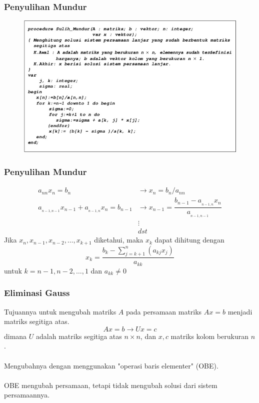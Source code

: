 \documentclass{beamer}
\begin{document}

\begin{frame}
\frametitle{Penyulihan Mundur}
\begin{figure}[htp]
\centering
\includegraphics[scale=0.45]{sulihmundur.jpg}
\end{figure}\end{frame}


\begin{frame}
\frametitle{Penyulihan Mundur}
\begin{equation}
\begin{split}
a_{nn}x_n = b_n &\rightarrow x_n = b_n/a_{nn}
\\a_{_{n-1,n-1}}x_{n-1}+a_{_{n-1,n}}x_n = b_{n-1} &\rightarrow x_{n-1} = \dfrac{b_{n-1}-a_{_{n-1,n}}x_n}{a_{_{n-1,n-1}}}
\\&\vdots
\\&dst
\end{split}
\nonumber
\end{equation}
Jika $x_n,x_{n-1},x_{n-2},\dots,x_{k+1}$ diketahui, maka $x_k$ dapat dihitung dengan 
\begin{equation}
x_k = \dfrac{b_k - \sum_{j=k+1}^n{(a_{kj}x_j)}}{a_{kk}}
\nonumber
\end{equation}
untuk $k=n-1,n-2,\dots, 1$ dan $a_{kk} \neq 0$
\end{frame}


\begin{frame}
\frametitle{Eliminasi Gauss}
Tujuannya untuk mengubah matriks $A$ pada persamaan matriks $Ax=b$ menjadi matriks segitiga atas. 
\begin{equation}
Ax=b \rightarrow Ux=c
\nonumber
\end{equation}
dimana $U$ adalah matriks segitiga atas $n\times n$, dan  $x,c$ matriks kolom berukuran $n$.
\\\ \\Mengubahnya dengan menggunakan "operasi baris elementer" (OBE).
\\\ \\OBE mengubah persamaan, tetapi tidak mengubah solusi dari sistem persamaannya.
\end{frame}
\end{document}
